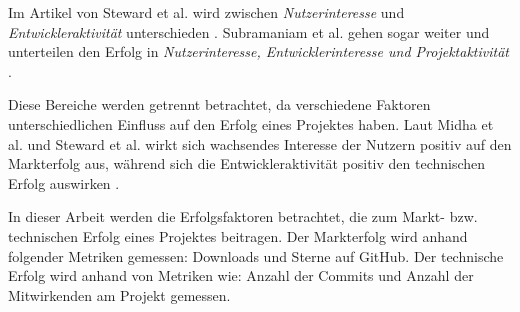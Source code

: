 Im Artikel von Steward et al. wird zwischen \textit{Nutzerinteresse} und \textit{Entwickleraktivität} unterschieden
\cite{stewartImpactsLicenseChoice2006a}. %
Subramaniam et al. gehen sogar weiter und unterteilen den Erfolg in
\textit{Nutzerinteresse, Entwicklerinteresse und Projektaktivität}
\cite{subramaniamDeterminantsOpenSource2009}. %

Diese Bereiche werden getrennt betrachtet, da verschiedene Faktoren unterschiedlichen Einfluss
auf den Erfolg eines Projektes haben.
Laut Midha et al. und Steward et al. wirkt sich wachsendes Interesse der Nutzern positiv auf den
Markterfolg aus, während sich die Entwickleraktivität positiv den technischen Erfolg auswirken
\cite{midhaFactorsAffectingSuccess2012, %
    stewartImpactsLicenseChoice2006a}. %




In dieser Arbeit werden die Erfolgsfaktoren betrachtet, die zum Markt- bzw. technischen Erfolg
eines Projektes beitragen.
Der Markterfolg wird anhand folgender Metriken gemessen:
Downloads und Sterne auf GitHub.
Der technische Erfolg wird anhand von Metriken wie:
Anzahl der Commits und Anzahl der Mitwirkenden am Projekt gemessen.





